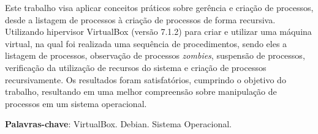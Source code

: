 \documentclass[
	12pt,				%
	oneside,   	        %
	a4paper,			%
	english,			%
	french,				%
	spanish,			%
	brazil,				%
	]{pacotes/abntex2}
\begin{document}
\frenchspacing 



\imprimirfolhaderosto



\begin{resumo}
Este trabalho visa aplicar conceitos práticos sobre gerência e criação de processos, desde a listagem de processos à criação de processos de forma recursiva. Utilizando hipervisor VirtualBox (versão 7.1.2) para criar e utilizar uma máquina virtual, na qual foi realizada uma sequência de procedimentos, sendo eles a listagem de processos, observação de processos \textit{zombies}, suspensão de processos, verificação da utilização de recursos do sistema e criação de processos recursivamente. Os resultados foram satisfatórios, cumprindo o objetivo do trabalho, resultando em uma melhor compreensão sobre manipulação de processos em um sistema operacional.

 \vspace{\onelineskip}
    
 \noindent
 \textbf{Palavras-chave}: VirtualBox. Debian. Sistema Operacional.
\end{resumo}




\tableofcontents*
\cleardoublepage

\textual
\end{document}

